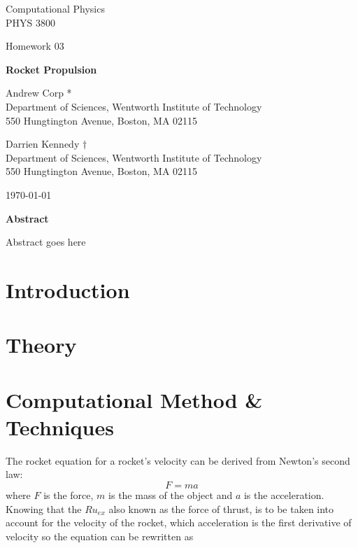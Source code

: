 \documentclass[11pt]{article}
\begin{document}
\begin{titlepage}

	\centering
	{\Large Computational Physics \\ PHYS 3800 \par}
	\vspace{0.25cm}
	{\Large Homework 03 \par}
	\vspace{2cm}
	
	{\huge \textbf{ Rocket Propulsion} \par}
	\vspace{1cm}
	
	{\large Andrew Corp * \\ Department of Sciences, Wentworth Institute of Technology \\ 550 Hungtington Avenue, Boston, MA 02115}
	
		{\large Darrien Kennedy $\dagger$ \\ Department of Sciences, Wentworth Institute of Technology \\ 550 Hungtington Avenue, Boston, MA 02115}

	{\large \today \par}
\end{titlepage}
\newpage

{\centering \textbf{Abstract} \par}

Abstract goes here

\section{Introduction}

\section{Theory}

\section{Computational Method \& Techniques}
The rocket equation for a rocket's velocity can be derived from Newton's second law:
\begin{equation}
F = ma
\end{equation}
where $F$ is the force, $m$ is the mass of the object and $a$ is the acceleration. Knowing that the $Ru_{ex}$ also known as the force of thrust, is to be taken into account for the velocity of the rocket, which acceleration is the first derivative of velocity so the equation can be rewritten as
\end{document}
